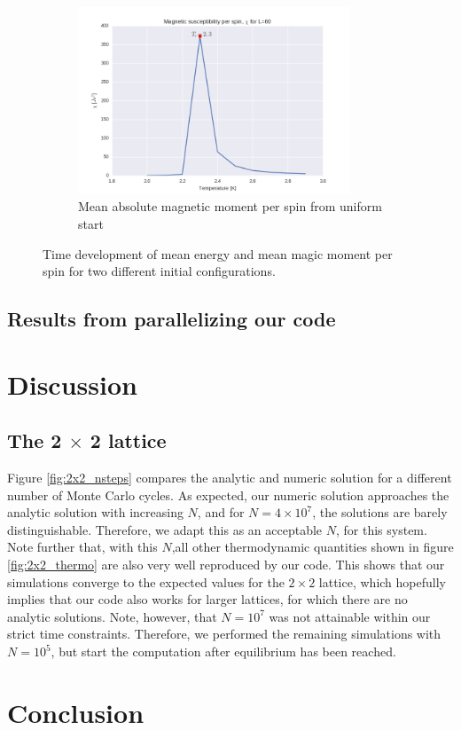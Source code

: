 \documentclass[a4paper, 10pt]{article}
\begin{document}
\begin{figure}[!ht]
    ~ 
    \begin{subfigure}[H!]{0.5\textwidth}
        \centering
        \includegraphics[height=2.2in]{chil60Ne5.png}
        \caption{Mean absolute magnetic moment per spin from uniform start}
    \end{subfigure}
      \caption{Time development of mean energy and mean magic moment per spin for two different initial configurations.}
\end{figure}
\subsection{Results from parallelizing our code}
\section{Discussion}
\subsection{The 2 $\times$ 2 lattice}
Figure \ref{fig:2x2_nsteps} compares the analytic and numeric solution for a different number of Monte Carlo cycles. As expected, our numeric solution approaches the analytic solution with increasing $N$, and for $N=4\times 10^7$, the solutions are barely distinguishable. Therefore, we adapt this as an acceptable $N$, for this system.  Note further that, with this $N$,all other thermodynamic quantities shown in figure \ref{fig:2x2_thermo} are also very well reproduced by our code. This shows that our simulations converge to the expected values for the $2\times2$ lattice, which hopefully implies that our code also works for larger lattices, for which there are no analytic solutions. Note, however, that $N=10^7$ was not attainable within our strict time constraints. Therefore, we performed the remaining simulations with $N=10^5$, but start the computation after equilibrium has  been reached.  
\section{Conclusion}
\end{document}

